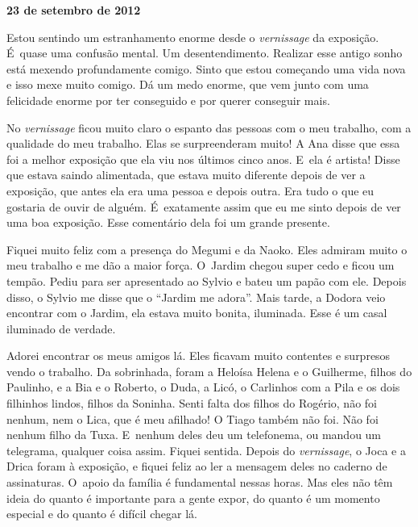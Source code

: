 \begin{center}\asterisc{}\end{center}


\begin{flushright}\textbf{23 de setembro de 2012}\end{flushright}


Estou sentindo um estranhamento enorme desde o \emph{vernissage} da
exposição. É~quase uma confusão mental. Um desentendimento. Realizar
esse antigo sonho está mexendo profundamente comigo. Sinto que estou
começando uma vida nova e isso mexe muito comigo. Dá um medo enorme, que
vem junto com uma felicidade enorme por ter conseguido e por querer
conseguir mais.

No \emph{vernissage} ficou muito claro o espanto das pessoas com o meu
trabalho, com a qualidade do meu trabalho. Elas se surpreenderam muito!
A Ana disse que essa foi a melhor exposição que ela viu nos últimos
cinco anos. E~ela é artista! Disse que estava saindo alimentada, que
estava muito diferente depois de ver a exposição, que antes ela era uma
pessoa e depois outra. Era tudo o que eu gostaria de ouvir de alguém. É~exatamente assim que eu me sinto depois de ver uma boa exposição. Esse
comentário dela foi um grande presente.

Fiquei muito feliz com a presença do Megumi e da Naoko. Eles admiram
muito o meu trabalho e me dão a maior força. O~Jardim chegou super cedo
e ficou um tempão. Pediu para ser apresentado ao Sylvio e bateu um papão
com ele. Depois disso, o Sylvio me disse que o ``Jardim me adora''. Mais
tarde, a Dodora veio encontrar com o Jardim, ela estava muito bonita,
iluminada. Esse é um casal iluminado de verdade.

Adorei encontrar os meus amigos lá. Eles ficavam muito contentes e
surpresos vendo o trabalho. Da sobrinhada, foram a Heloísa Helena e o
Guilherme, filhos do Paulinho, e a Bia e o Roberto, o Duda, a Licó, o
Carlinhos com a Pila e os dois filhinhos lindos, filhos da Soninha.
Senti falta dos filhos do Rogério, não foi nenhum, nem o Lica, que é meu
afilhado! O Tiago também não foi. Não foi nenhum filho da Tuxa. E~nenhum
deles deu um telefonema, ou mandou um telegrama, qualquer coisa assim.
Fiquei sentida. Depois do \emph{vernissage}, o Joca e a Drica foram à
exposição, e fiquei feliz ao ler a mensagem deles no caderno de
assinaturas. O~apoio da família é fundamental nessas horas. Mas eles não
têm ideia do quanto é importante para a gente expor, do quanto é um
momento especial e do quanto é difícil chegar lá.

